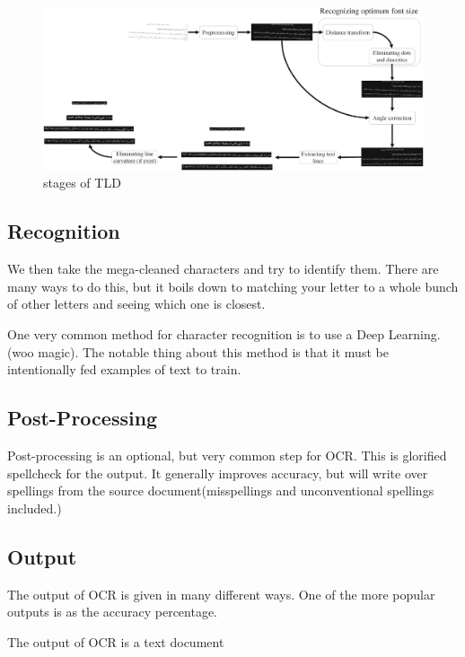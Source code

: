 \documentclass[sigplan,screen,nonacm]{acmart-tagged}
\begin{document}
\begin{figure}
  \includegraphics[width=\linewidth]{TLD.png}
  \caption{stages of TLD}
  \label{fig:tld}
\end{figure}

\subsection{Recognition}
\label{Recognition}

We then take the mega-cleaned characters and try to identify them. There are many ways to do this, but it boils down to matching your letter to a whole bunch of other letters and seeing which one is closest.

One very common method for character recognition is to use a Deep Learning. (woo magic). The notable thing about this method is that it must be intentionally fed examples of text to train.

\subsection{Post-Processing}
\label{sec:Post-Processing}

Post-processing is an optional, but very common step for OCR. This is glorified spellcheck for the output. It generally improves accuracy, but will write over spellings from the source document(misspellings and unconventional spellings included.)

\subsection{Output}
\label{sec:Output}

The output of OCR is given in many different ways. One of the more popular outputs is as the accuracy percentage.

The output of OCR is a text document
\cite{Raj:2022,Avyodri:2022,Thorat:2022}
\end{document}
